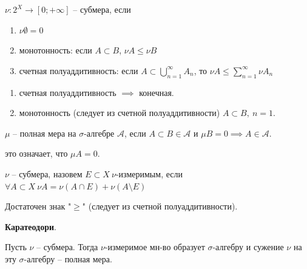 \begin{definition}
    $\nu : 2^{X} \rightarrow [0; +\infty]$ -- субмера, если 

    \begin{enumerate}
        \item $\nu \emptyset = 0$
        \item монотонность: если $A \subset B$, $\nu A \leq \nu B$
        \item счетная полуаддитивность: если  $A \subset \bigcup_{n=1}^{\infty} A_n$, то $\nu A \leq \sum_{n=1}^{\infty} \nu A_n$
    \end{enumerate}
\end{definition}
\begin{remark}
    \begin{enumerate}
        \item счетная полуаддитивность $\implies$ конечная.
        \item монотонность (следует из счетной полуаддитивности) $A \subset B, \ n=1$.
    \end{enumerate}
\end{remark}

\begin{definition}
    $\mu$ -- полная мера на $\sigma$-алгебре $\mathcal{A}$, если $A \subset B \in \mathcal{A}$ и $\mu B = 0 \implies A \in \mathcal{A}$.
    
    \begin{remark}
        это означает, что $\mu A = 0$.
    \end{remark}
\end{definition}

\begin{definition}
    $\nu$ -- субмера, назовем $E \subset X \ \nu$-измеримым, если $\forall A \subset X \ \nu A = \nu (A \cap E) + \nu (A \setminus E)$


    \begin{remark}
        Достаточен знак "$\geq$" (следует из счетной полуаддитивности).
    \end{remark}
\end{definition}

\begin{theorem}
    \textbf{Каратеодори}.
    
    Пусть $\nu$ -- субмера. Тогда $\nu$-измеримое мн-во образует $\sigma$-алгебру и сужение $\nu$ на эту $\sigma$-алгебру -- полная мера.
\end{theorem}

